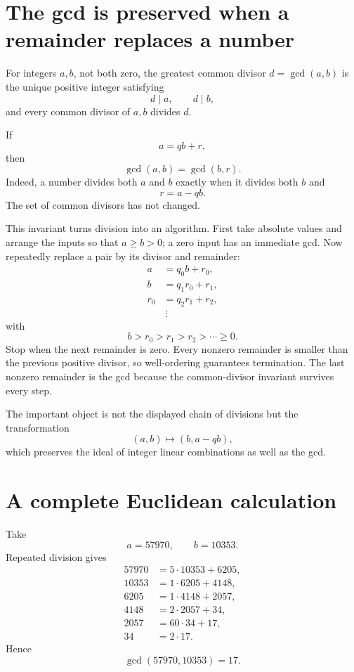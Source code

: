 \section{The gcd is preserved when a remainder replaces a number}

For integers \(a,b\), not both zero, the greatest common divisor \(d=\gcd(a,b)\) is the unique positive integer satisfying
\[
  d\mid a,
  \qquad
  d\mid b,
\]
and every common divisor of \(a,b\) divides \(d\).

If
\[
  a=qb+r,
\]
then
\[
  \gcd(a,b)=\gcd(b,r).
\]
Indeed, a number divides both \(a\) and \(b\) exactly when it divides both \(b\) and
\[
  r=a-qb.
\]
The set of common divisors has not changed.

This invariant turns division into an algorithm. First take absolute values and arrange the inputs so that $a\ge b>0$; a zero input has an immediate gcd. Now repeatedly replace a pair by its divisor and remainder:
\[
\begin{aligned}
  a&=q_0b+r_0,\\
  b&=q_1r_0+r_1,\\
  r_0&=q_2r_1+r_2,\\
  &\ \vdots
\end{aligned}
\]
with
\[
  b>r_0>r_1>r_2>\cdots\ge0.
\]
Stop when the next remainder is zero. Every nonzero remainder is smaller than the previous positive divisor, so well-ordering guarantees termination. The last nonzero remainder is the gcd because the common-divisor invariant survives every step.

The important object is not the displayed chain of divisions but the transformation
\[
  (a,b)\longmapsto(b,a-qb),
\]
which preserves the ideal of integer linear combinations as well as the gcd.

\section{A complete Euclidean calculation}

Take
\[
  a=57970,
  \qquad
  b=10353.
\]
Repeated division gives
\[
\begin{aligned}
  57970&=5\cdot10353+6205,\\
  10353&=1\cdot6205+4148,\\
  6205&=1\cdot4148+2057,\\
  4148&=2\cdot2057+34,\\
  2057&=60\cdot34+17,\\
  34&=2\cdot17.
\end{aligned}
\]
Hence
\[
  \gcd(57970,10353)=17.
\]

